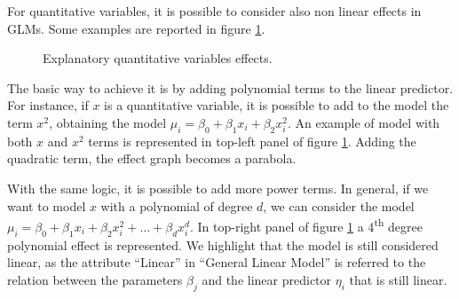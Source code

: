 \documentclass[a4paper, nobind]{templates/ociamthesis}
\theoremstyle{definition}
\theoremstyle{definition}
\theoremstyle{definition}
\theoremstyle{remark}
\begin{document}
For quantitative variables, it is possible to consider also non linear effects in GLMs. Some examples are reported in figure \ref{fig:expl-var-quant-effect}.





\begin{figure}[!hbtp]

{\centering {}\newline{}

}

\caption{Explanatory quantitative variables effects.}\label{fig:expl-var-quant-effect}
\end{figure}

The basic way to achieve it is by adding polynomial terms to the linear predictor. For instance, if \(x\) is a quantitative variable, it is possible to add to the model the term \(x^2\), obtaining the model \(\mu_i = \beta_0 + \beta_1 x_{i} + \beta_2 x_i^2\). An example of model with both \(x\) and \(x^2\) terms is represented in top-left panel of figure \ref{fig:expl-var-quant-effect}. Adding the quadratic term, the effect graph becomes a parabola.

With the same logic, it is possible to add more power terms. In general, if we want to model \(x\) with a polynomial of degree \(d\), we can consider the model \(\mu_i = \beta_0 + \beta_1 x_{i} + \beta_2 x_{i}^2 + \dots + \beta_d x_{i}^d\). In top-right panel of figure \ref{fig:expl-var-quant-effect} a 4\textsuperscript{th} degree polynomial effect is represented. We highlight that the model is still considered linear, as the attribute ``Linear'' in ``General Linear Model'' is referred to the relation between the parameters \(\beta_j\) and the linear predictor \(\eta_i\) that is still linear.
\end{document}
